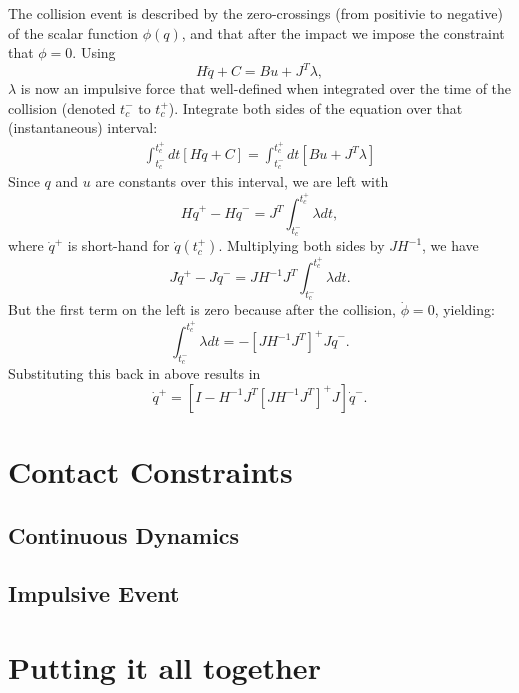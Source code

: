 \documentclass{article}
\begin{document}
The collision event is described by the
zero-crossings (from positivie to negative) of the scalar function
$\phi(q)$, and that after the impact we impose the constraint that
$\phi = 0$.  Using $$H\ddot{q} + C = Bu + J^T \lambda,$$ 
$\lambda$ is now an impulsive force that 
well-defined when integrated over the time of the collision (denoted
$t_c^-$ to $t_c^+$).  Integrate both sides of the equation
over that (instantaneous) interval:
\begin{align*}\int_{t_c^-}^{t_c^+} dt\left[  H \ddot{q} + C \right] =
\int_{t_c^-}^{t_c^+} dt \left[ Bu + J^T \lambda \right]
\end{align*}
Since $q$ and $u$ are constants over this interval, we are left
with
$$H\dot{q}^+ - H\dot{q}^- = J^T \int_{t_c^-}^{t_c^+} \lambda dt,$$ 
where $\dot{q}^+$ is short-hand
for $\dot{q}(t_c^+)$.  Multiplying both sides by $J H^{-1}$, we have 
$$ J \dot{q}^+ - J\dot{q}^- = J H^{-1} J^T \int_{t_c^-}^{t_c^+} \lambda dt.$$
But the first term on the left is zero because after the collision,
$\dot\phi = 0$, yielding:
$$\int_{t_c^-}^{t_c^+} \lambda dt = - \left[ J H^{-1} J^T \right]^+
J \dot{q}^-.$$  Substituting this back in above results in 
$$\dot{q}^+ = \left[ I - H^{-1} J^T \left[ J H^{-1} J^T \right]^+ J
\right] \dot{q}^-.$$


\section{Contact Constraints}

\subsection{Continuous Dynamics}

\subsection{Impulsive Event}


\section{Putting it all together}


%
%
\end{document}
